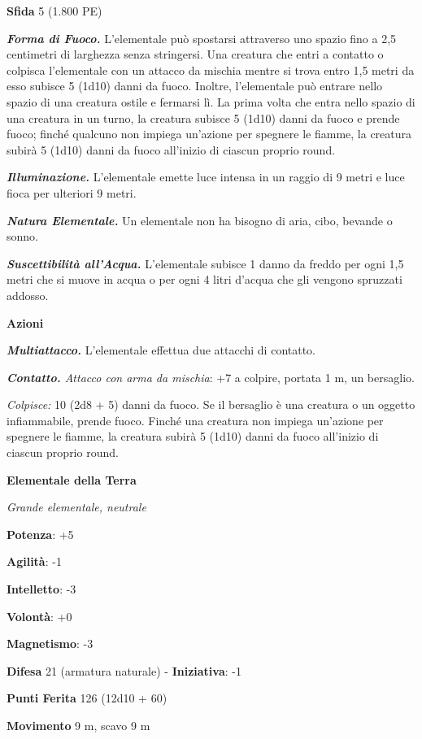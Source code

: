 \begin{multicols}{2}
\textbf{Sfida} 5 (1.800 PE)\smallskip

\emph{\textbf{Forma di Fuoco.}} L'elementale può spostarsi attraverso
uno spazio fino a 2,5 centimetri di larghezza senza stringersi. Una
creatura che entri a contatto o colpisca l'elementale con un attacco da
mischia mentre si trova entro 1,5 metri da esso subisce 5 (1d10) danni
da fuoco. Inoltre, l'elementale può entrare nello spazio di una creatura
ostile e fermarsi lì. La prima volta che entra nello spazio di una
creatura in un turno, la creatura subisce 5 (1d10) danni da fuoco e
prende fuoco; finché qualcuno non impiega un'azione per spegnere le
fiamme, la creatura subirà 5 (1d10) danni da fuoco all'inizio di ciascun
proprio round.

\emph{\textbf{Illuminazione.}} L'elementale emette luce intensa in un
raggio di 9 metri e luce fioca per ulteriori 9 metri.

\emph{\textbf{Natura Elementale.}} Un elementale non ha bisogno di aria,
cibo, bevande o sonno.

\emph{\textbf{Suscettibilità all'Acqua.}} L'elementale subisce 1 danno
da freddo per ogni 1,5 metri che si muove in acqua o per ogni 4 litri
d'acqua che gli vengono spruzzati addosso.

\smallskip\textbf{Azioni}

\emph{\textbf{Multiattacco.}} L'elementale effettua due attacchi di
contatto.

\emph{\textbf{Contatto.} Attacco con arma da mischia}: +7 a colpire,
portata 1 m, un bersaglio.

\emph{Colpisce:} 10 (2d8 + 5) danni da fuoco. Se il bersaglio è una
creatura o un oggetto infiammabile, prende fuoco. Finché una creatura
non impiega un'azione per spegnere le fiamme, la creatura subirà 5
(1d10) danni da fuoco all'inizio di ciascun proprio round.

\textbf{Elementale della Terra}

\emph{Grande elementale, neutrale}

\textbf{Potenza}: +5

\textbf{Agilità}: -1

\textbf{Intelletto}: -3

\textbf{Volontà}: +0

\textbf{Magnetismo}: -3

\textbf{Difesa} 21 (armatura naturale) - \textbf{Iniziativa}: -1

\textbf{Punti Ferita} 126 (12d10 + 60)

\textbf{Movimento} 9 m, scavo 9 m


\end{multicols}
